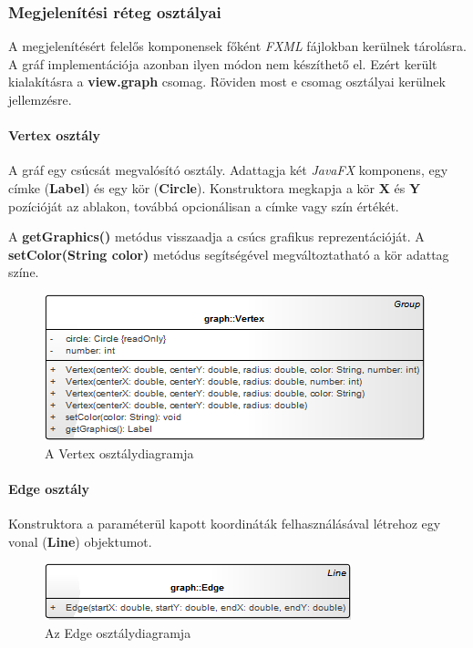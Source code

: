 \documentclass{elteikthesis}
\begin{document}
\subsubsection{Megjelenítési réteg osztályai}
A megjelenítésért felelős komponensek főként \emph{FXML} fájlokban kerülnek tárolásra. A gráf implementációja azonban ilyen módon nem készíthető el. Ezért került kialakításra a \textbf{view.graph} csomag. Röviden most e csomag osztályai kerülnek jellemzésre.
\paragraph{Vertex osztály}
A gráf egy csúcsát megvalósító osztály. Adattagja két \emph{JavaFX} komponens, egy címke (\textbf{Label}) és egy kör (\textbf{Circle}). Konstruktora megkapja a kör \textbf{X} és \textbf{Y} pozícióját az ablakon, továbbá opcionálisan a címke vagy szín értékét.\par
A \textbf{getGraphics()} metódus visszaadja a csúcs grafikus reprezentációját. A \textbf{setColor(String color)} metódus segítségével megváltoztatható a kör adattag színe.
\begin{figure}[H]
	\centering
	\includegraphics{pics/class/Vertex.png}
	\caption{A Vertex osztálydiagramja}
\end{figure}
\paragraph{Edge osztály}
Konstruktora a paraméterül kapott koordináták felhasználásával létrehoz egy vonal (\textbf{Line}) objektumot.
\begin{figure}[H]
	\centering
	\includegraphics{pics/class/Edge.png}
	\caption{Az Edge osztálydiagramja}
\end{figure}
\end{document}
